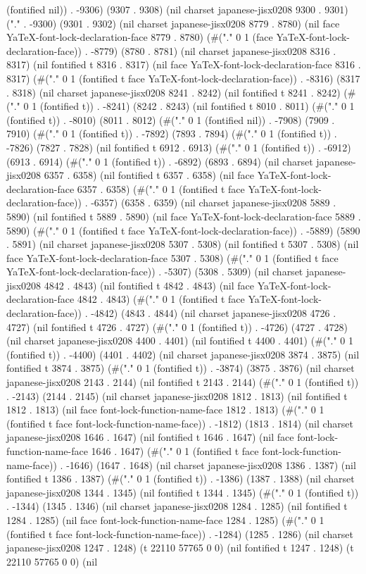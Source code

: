 (fontified nil)) . -9306) (9307 . 9308) (nil charset japanese-jisx0208 9300 . 9301) ("." . -9300) (9301 . 9302) (nil charset japanese-jisx0208 8779 . 8780) (nil face YaTeX-font-lock-declaration-face 8779 . 8780) (#("." 0 1 (face YaTeX-font-lock-declaration-face)) . -8779) (8780 . 8781) (nil charset japanese-jisx0208 8316 . 8317) (nil fontified t 8316 . 8317) (nil face YaTeX-font-lock-declaration-face 8316 . 8317) (#("." 0 1 (fontified t face YaTeX-font-lock-declaration-face)) . -8316) (8317 . 8318) (nil charset japanese-jisx0208 8241 . 8242) (nil fontified t 8241 . 8242) (#("." 0 1 (fontified t)) . -8241) (8242 . 8243) (nil fontified t 8010 . 8011) (#("." 0 1 (fontified t)) . -8010) (8011 . 8012) (#("." 0 1 (fontified nil)) . -7908) (7909 . 7910) (#("." 0 1 (fontified t)) . -7892) (7893 . 7894) (#("." 0 1 (fontified t)) . -7826) (7827 . 7828) (nil fontified t 6912 . 6913) (#("." 0 1 (fontified t)) . -6912) (6913 . 6914) (#("." 0 1 (fontified t)) . -6892) (6893 . 6894) (nil charset japanese-jisx0208 6357 . 6358) (nil fontified t 6357 . 6358) (nil face YaTeX-font-lock-declaration-face 6357 . 6358) (#("." 0 1 (fontified t face YaTeX-font-lock-declaration-face)) . -6357) (6358 . 6359) (nil charset japanese-jisx0208 5889 . 5890) (nil fontified t 5889 . 5890) (nil face YaTeX-font-lock-declaration-face 5889 . 5890) (#("." 0 1 (fontified t face YaTeX-font-lock-declaration-face)) . -5889) (5890 . 5891) (nil charset japanese-jisx0208 5307 . 5308) (nil fontified t 5307 . 5308) (nil face YaTeX-font-lock-declaration-face 5307 . 5308) (#("." 0 1 (fontified t face YaTeX-font-lock-declaration-face)) . -5307) (5308 . 5309) (nil charset japanese-jisx0208 4842 . 4843) (nil fontified t 4842 . 4843) (nil face YaTeX-font-lock-declaration-face 4842 . 4843) (#("." 0 1 (fontified t face YaTeX-font-lock-declaration-face)) . -4842) (4843 . 4844) (nil charset japanese-jisx0208 4726 . 4727) (nil fontified t 4726 . 4727) (#("." 0 1 (fontified t)) . -4726) (4727 . 4728) (nil charset japanese-jisx0208 4400 . 4401) (nil fontified t 4400 . 4401) (#("." 0 1 (fontified t)) . -4400) (4401 . 4402) (nil charset japanese-jisx0208 3874 . 3875) (nil fontified t 3874 . 3875) (#("." 0 1 (fontified t)) . -3874) (3875 . 3876) (nil charset japanese-jisx0208 2143 . 2144) (nil fontified t 2143 . 2144) (#("." 0 1 (fontified t)) . -2143) (2144 . 2145) (nil charset japanese-jisx0208 1812 . 1813) (nil fontified t 1812 . 1813) (nil face font-lock-function-name-face 1812 . 1813) (#("." 0 1 (fontified t face font-lock-function-name-face)) . -1812) (1813 . 1814) (nil charset japanese-jisx0208 1646 . 1647) (nil fontified t 1646 . 1647) (nil face font-lock-function-name-face 1646 . 1647) (#("." 0 1 (fontified t face font-lock-function-name-face)) . -1646) (1647 . 1648) (nil charset japanese-jisx0208 1386 . 1387) (nil fontified t 1386 . 1387) (#("." 0 1 (fontified t)) . -1386) (1387 . 1388) (nil charset japanese-jisx0208 1344 . 1345) (nil fontified t 1344 . 1345) (#("." 0 1 (fontified t)) . -1344) (1345 . 1346) (nil charset japanese-jisx0208 1284 . 1285) (nil fontified t 1284 . 1285) (nil face font-lock-function-name-face 1284 . 1285) (#("." 0 1 (fontified t face font-lock-function-name-face)) . -1284) (1285 . 1286) (nil charset japanese-jisx0208 1247 . 1248) (t 22110 57765 0 0) (nil fontified t 1247 . 1248) (t 22110 57765 0 0) (nil 